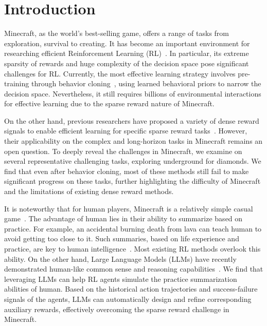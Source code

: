 \section{Introduction}
\label{sec:intro}

Minecraft, as the world's best-selling game, offers a range of tasks from exploration, survival to creating. It has become an important environment for researching efficient Reinforcement Learning (RL)~\cite{johnson2016malmo,guss2019minerl}. In particular, its extreme sparsity of rewards and huge complexity of the decision space pose significant challenges for RL. Currently, the most effective learning strategy involves pre-training through behavior cloning~\cite{baker2022video}, using learned behavioral priors to narrow the decision space. Nevertheless, it still requires billions of environmental interactions for effective learning due to the sparse reward nature of Minecraft.

On the other hand, previous researchers have proposed a variety of dense reward signals to enable efficient learning for specific sparse reward tasks~\cite{pathak2017curiosity,li2020random,oh2018self,andrychowicz2017hindsight,levy2017learning}. However, their applicability on the complex and long-horizon tasks in Minecraft remains an open question. To deeply reveal the challenges in Minecraft, we examine on several representative challenging tasks, \eg exploring underground for diamonds. We find that even after behavior cloning, most of these methods still fail to make significant progress on these tasks, further highlighting the difficulty of Minecraft and the limitations of existing dense reward methods.



It is noteworthy that for human players, Minecraft is a relatively simple casual game~\cite{duncan2011minecraft}. The advantage of human lies in their ability to summarize based on practice. For example, an accidental burning death from lava can teach human to avoid getting too close to it. Such summaries, based on life experience and practice, are key to human intelligence~\cite{tierney2009brain,seo2021impact}. Most existing RL methods overlook this ability. 
On the other hand, Large Language Models (LLMs) have recently demonstrated human-like common sense and reasoning capabilities~\cite{openai2023gpt,zhao2023survey,huang2022towards}. We find that leveraging LLMs can help RL agents simulate the practice summarization abilities of human. Based on the historical action trajectories and success-failure signals of the agents, LLMs can automatically design and refine corresponding auxiliary rewards, effectively overcoming the sparse reward challenge in Minecraft.


